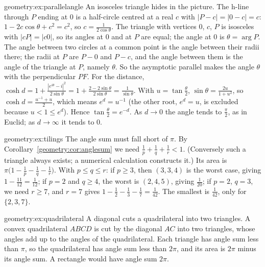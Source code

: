 \begin{solution}{geometry:ex:parallelangle}
\idea An isosceles triangle hides in the picture.
\writeup The h-line through $P$ ending at $0$ is a half-circle centred at a real $c$ with $|P-c|=|0-c|=c$: $1-2c\cos\theta+c^2=c^2$, so $c=\frac1{2\cos\theta}$.
The triangle with vertices $0$, $c$, $P$ is isosceles with $|cP|=|c0|$, so its angles at $0$ and at $P$ are equal; the angle at $0$ is $\theta=\arg P$. The angle
between two circles at a common point is the angle between their radii there; the radii at $P$ are $P-0$ and $P-c$, and the angle between them is the angle of the
triangle at $P$, namely $\theta$. So the asymptotic parallel makes the angle $\theta$ with the perpendicular $PF$. For the distance,
$\cosh d=1+\frac{|e^{i\theta}-i|^2}{2\sin\theta}=1+\frac{2-2\sin\theta}{2\sin\theta}=\frac1{\sin\theta}$. With $u=\tan\frac\theta2$, $\sin\theta=\frac{2u}{1+u^2}$, so
$\cosh d=\frac{u^{-1}+u}2$, which means $e^{d}=u^{-1}$ (the other root, $e^d=u$, is excluded because $u<1\le e^d$). Hence $\tan\frac\theta2=e^{-d}$. As $d\to0$
the angle tends to $\frac\pi2$, as in Euclid; as $d\to\infty$ it tends to $0$.
\end{solution}

\begin{solution}{geometry:ex:tilings}
\idea The angle sum must fall short of $\pi$.
\writeup By Corollary~\ref{geometry:cor:anglesum} we need $\frac1p+\frac1q+\frac1r<1$. (Conversely such a
triangle always exists; a numerical calculation constructs it.) Its area is $\pi\bigl(1-\frac1p-\frac1q-\frac1r\bigr)$. With
$p\le q\le r$: if $p\ge3$, then $(3,3,4)$ is the worst case, giving $1-\frac{11}{12}=\frac1{12}$; if $p=2$ and $q\ge4$, the worst is $(2,4,5)$, giving $\frac1{20}$;
if $p=2$, $q=3$, we need $r\ge7$, and $r=7$ gives $1-\frac12-\frac13-\frac17=\frac1{42}$. The smallest is $\frac1{42}$, only for $\{2,3,7\}$.
\end{solution}

\begin{solution}{geometry:ex:quadrilateral}
\idea A diagonal cuts a quadrilateral into two triangles.
\writeup A convex quadrilateral $ABCD$ is cut by the diagonal $AC$ into two triangles, whose angles add up to the angles of the quadrilateral. Each triangle has
angle sum less than $\pi$, so the quadrilateral has angle sum less than $2\pi$, and its area is $2\pi$ minus its angle sum. A rectangle would have angle sum
$2\pi$.
\end{solution}

